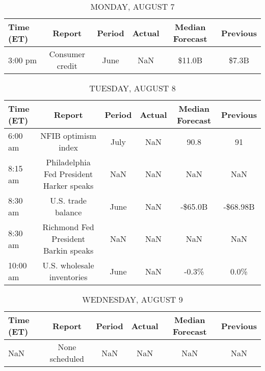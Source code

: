 \documentclass{article}%
\begin{document}
%
\normalsize%


\begin{table}[htbp]%
\caption{MONDAY, AUGUST 7}%
\centering%
\begin{adjustbox}{width=1\textwidth}%
\begin{tabular}{lccccc}
\toprule
Time (ET) &          Report & Period & Actual & Median Forecast & Previous \\
\midrule
  3:00 pm & Consumer credit &   June &    NaN &          \$11.0B &    \$7.3B \\
\bottomrule
\end{tabular}
%
\end{adjustbox}%
\end{table}

%


\begin{table}[htbp]%
\caption{TUESDAY, AUGUST 8}%
\centering%
\begin{adjustbox}{width=1\textwidth}%
\begin{tabular}{lccccc}
\toprule
Time (ET) &                                   Report & Period & Actual & Median Forecast & Previous \\
\midrule
  6:00 am &                      NFIB optimism index &   July &    NaN &            90.8 &       91 \\
  8:15 am & Philadelphia Fed President Harker speaks &    NaN &    NaN &             NaN &      NaN \\
  8:30 am &                       U.S. trade balance &   June &    NaN &         -\$65.0B & -\$68.98B \\
  8:30 am &     Richmond Fed President Barkin speaks &    NaN &    NaN &             NaN &      NaN \\
 10:00 am &               U.S. wholesale inventories &   June &    NaN &           -0.3\% &     0.0\% \\
\bottomrule
\end{tabular}
%
\end{adjustbox}%
\end{table}

%


\begin{table}[htbp]%
\caption{WEDNESDAY, AUGUST 9}%
\centering%
\begin{adjustbox}{width=1\textwidth}%
\begin{tabular}{lccccc}
\toprule
Time (ET) &         Report & Period & Actual & Median Forecast & Previous \\
\midrule
      NaN & None scheduled &    NaN &    NaN &             NaN &      NaN \\
\bottomrule
\end{tabular}
%
\end{adjustbox}%
\end{table}
\end{document}
